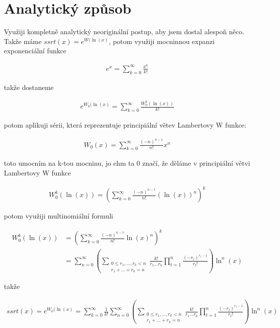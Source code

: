 \section{Analytický způsob}

Využiji kompletně analytický neoriginální postup,
aby jsem dostal alespoň něco. Takže máme
\(ssrt(x)=e^{W(\ln(x)}\), potom využiji mocninnou 
expanzi exponenciální funkce

\begin{align}
        e^x = \sum_{k=0}^\infty \frac{x^k}{k!}
\end{align}

takže dostaneme

\begin{align}
        e^{W_0(\ln(x)} = \sum_{k=0}^{
        \infty}\frac{W_0^k(\ln(x))}{k!}
\end{align}

potom aplikuji sérii, která reprezentuje
principiální větev Lambertovy W funkce:

\begin{align}
        W_0(x) = \sum_{k=0}^\infty 
        \frac{(-n)^{n-1}}{n!}x^n
\end{align}

toto umocním na k-tou mocninu, jo ehm 
ta 0 značí, že děláme v principiální
větvi Lambertovy W funkce

\begin{align}
        W_0^k(\ln(x)) = \left(\sum_{k=
        0}^\infty \frac{(-n)^{n-1}}{n!}(
        \ln(x))^n\right)^k
\end{align}

potom využiji multinomiální formuli

\begin{align}
        W_0^k(\ln(x)) &= \left(\sum_{k=0}^\infty 
        \frac{(-n)^{n-1}}{n!}\ln(x)^n\right)^k \\
        &= \sum_{n=0}^\infty \left(\sum_{\substack{0
        \leq r_1 , ..., r_k <n \\ r_1 + ... + r_k = 
        n}}\frac{k!}{r_1 ... r_k}\prod_{t=1}^n \frac{(
        -r_t)^{r_t - 1}}{r_t !} \right)\ln^n(x)
\end{align}

takže

\begin{align}
        ssrt(x) = e^{W_0(\ln(x)} = 
        \sum_{k=0}^{\infty}\frac{1}{k!}
        \sum_{n=0}^\infty \left(\sum_{
        \substack{0\leq r_1 , ..., r_k 
        <n \\ r_1 + ... + r_k = n}}\frac
        {k!}{r_1 ... r_k}\prod_{t=1}^n 
        \frac{(-r_t)^{r_t - 1}}{r_t !} 
        \right)\ln^n(x)
\end{align}

